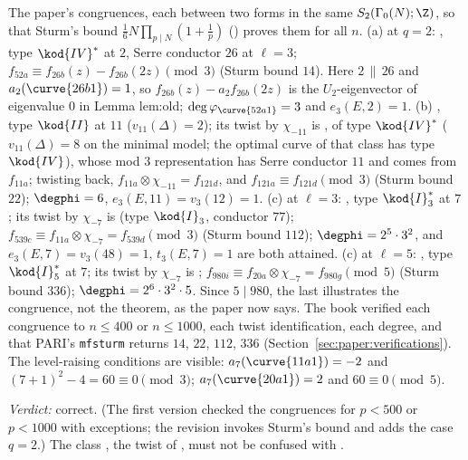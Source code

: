 \begin{sloppypar}
\begin{example}\label{ex:paper:qual}
The paper's congruences, each between two forms in the same $S_2(\Gamma_0(N);\Z)$, so that Sturm's bound $\frac16N\prod_{p\mid N}(1+\frac1p)$ \cite{Sturm87} () proves them
for all $n$. (a) at $q=2$: , type $\kod{IV}^*$ at $2$, Serre conductor $26$ at $\ell=3$; $f_{52a}\equiv f_{26b}(z)-f_{26b}(2z)\pmod3$ (Sturm bound $14$). Here $2\,\|\,26$ and $a_2(\curve{26b1})=1$, so
$f_{26b}(z)-a_2f_{26b}(2z)$ is the $U_2$-eigenvector of eigenvalue $0$ in Lemma lem:old; $\deg\varphi_{\curve{52a1}}=3$ and $e_3(E,2)=1$. (b) , type $\kod{II}$ at $11$ ($v_{11}(\Delta)=2$); its twist
by $\chi_{-11}$ is , of type $\kod{IV}^*$ ($v_{11}(\Delta)=8$ on the minimal model; the optimal curve  of that class has type $\kod{IV}$), whose mod $3$ representation has
Serre conductor $11$ and comes from $f_{11a}$; twisting back, $f_{11a}\otimes\chi_{-11}=f_{121d}$, and $f_{121a}\equiv f_{121d}\pmod3$ (Sturm bound $22$); $\degphi=6$, $e_3(E,11)=v_3(12)=1$. (c) at $\ell=3$:
, type $\kod{I}_3^*$ at $7$; its twist by $\chi_{-7}$ is  (type $\kod{I}_3$, conductor $77$); $f_{539c}\equiv f_{11a}\otimes\chi_{-7}=f_{539d}\pmod3$ (Sturm bound $112$); $\degphi=2^5\cdot3^2$,
and $e_3(E,7)=v_3(48)=1$, $t_3(E,7)=1$ are both attained. (c) at $\ell=5$: , type $\kod{I}_5^*$ at $7$; its twist by $\chi_{-7}$ is ; $f_{980i}\equiv f_{20a}\otimes\chi_{-7}=f_{980g}\pmod5$
(Sturm bound $336$); $\degphi=2^6\cdot3^2\cdot5$. Since $5\mid980$, the last illustrates the congruence, not the theorem, as the paper now says. The book verified each congruence to
$n\le400$ or $n\le1000$, each twist identification, each degree, and that PARI's \texttt{mfsturm} returns $14$, $22$, $112$, $336$ (Section~\ref{sec:paper:verifications}). The level-raising
conditions are visible: $a_7(\curve{11a1})=-2$ and $(7+1)^2-4=60\equiv0\pmod3$; $a_7(\curve{20a1})=2$ and $60\equiv0\pmod5$.
\end{example}

\noindent\emph{Verdict:} correct. (The first version checked the congruences for $p<500$ or $p<1000$ with exceptions; the revision invokes Sturm's bound and adds the case
$q=2$.) The class , the twist of , must not be confused with .


\end{sloppypar}
